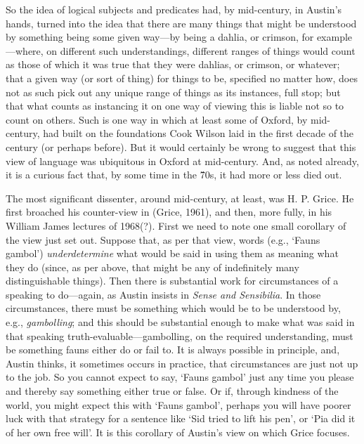 So the idea of logical subjects and predicates had, by mid-century, in Austin’s hands, turned into the idea that there are many things that might be understood by something being some given way---by being a dahlia, or crimson, for example---where, on different such understandings, different ranges of things would count as those of which it was true that they were dahlias, or crimson, or whatever; that a given way (or sort of thing) for things to be, specified no matter how, does not as such pick out any unique range of things as its instances, full stop; but that what counts as instancing it on one way of viewing this is liable not so to count on others. Such is one way in which at least some of Oxford, by mid-century, had built on the foundations Cook Wilson laid in the first decade of the century (or perhaps before). But it would certainly be wrong to suggest that this view of language was ubiquitous in Oxford at mid-century. And, as noted already, it is a curious fact that, by some time in the \'70s, it had more or less died out.

The most significant dissenter, around mid-century, at least, was H. P. Grice. He first broached his counter-view in (Grice, 1961), and then, more fully, in his William James lectures of 1968(?). First we need to note one small corollary of the view just set out. Suppose that, as per that view, words (e.g., `Fauns gambol') \emph{underdetermine} what would be said in using them as meaning what they do (since, as per above, that might be any of indefinitely many distinguishable things). Then there is substantial work for circumstances of a speaking to do---again, as Austin insists in \emph{Sense and Sensibilia}. In those circumstances, there must be something which would be to be understood by, e.g., \emph{gambolling}; and this should be substantial enough to make what was said in that speaking truth-evaluable---gambolling, on the required understanding, must be something fauns either do or fail to. It is always possible in principle, and, Austin thinks, it sometimes occurs in practice, that circumstances are just not up to the job. So you cannot expect to say, `Fauns gambol' just any time you please and thereby say something either true or false. Or if, through kindness of the world, you might expect this with `Fauns gambol', perhaps you will have poorer luck with that strategy for a sentence like `Sid tried to lift his pen', or `Pia did it of her own free will'. It is this corollary of Austin’s view on which Grice focuses.

